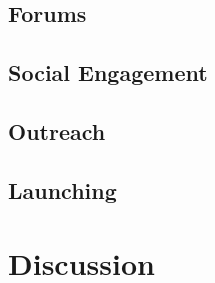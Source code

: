 \documentclass{sigchi}
\begin{document}


\subsection{Forums}



\subsection{Social Engagement}


\subsection{Outreach}


\subsection{Launching}


\section{Discussion}


\end{document}
